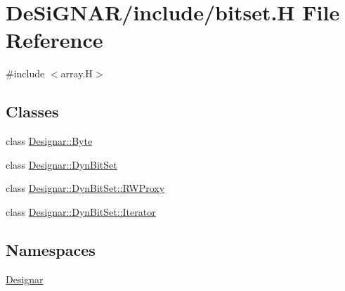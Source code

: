 \hypertarget{bitset_8_h}{}\section{De\+Si\+G\+N\+A\+R/include/bitset.H File Reference}
\label{bitset_8_h}
{\ttfamily \#include $<$array.\+H$>$}\newline
\subsection*{Classes}
\begin{DoxyCompactItemize}
\item 
class \hyperlink{class_designar_1_1_byte}{Designar\+::\+Byte}
\item 
class \hyperlink{class_designar_1_1_dyn_bit_set}{Designar\+::\+Dyn\+Bit\+Set}
\item 
class \hyperlink{class_designar_1_1_dyn_bit_set_1_1_r_w_proxy}{Designar\+::\+Dyn\+Bit\+Set\+::\+R\+W\+Proxy}
\item 
class \hyperlink{class_designar_1_1_dyn_bit_set_1_1_iterator}{Designar\+::\+Dyn\+Bit\+Set\+::\+Iterator}
\end{DoxyCompactItemize}
\subsection*{Namespaces}
\begin{DoxyCompactItemize}
\item 
 \hyperlink{namespace_designar}{Designar}
\end{DoxyCompactItemize}
